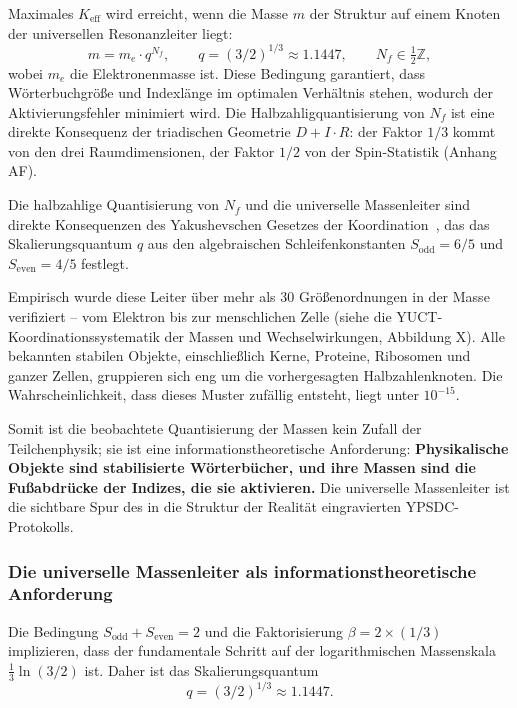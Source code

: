 \documentclass[12pt,a4paper]{article}
\theoremstyle{remark}
\begin{document}
	Maximales \(K_{\mathrm{eff}}\) wird erreicht, wenn die Masse \(m\) der Struktur auf einem Knoten der universellen Resonanzleiter liegt:
	\begin{equation}
		m = m_e \cdot q^{N_f}, \qquad
		q = (3/2)^{1/3} \approx 1.1447, \qquad N_f \in \tfrac{1}{2}\mathbb{Z},
		\label{eq:mass-ladder}
	\end{equation}
	wobei \(m_e\) die Elektronenmasse ist. Diese Bedingung garantiert, dass Wörterbuchgröße und Indexlänge im optimalen Verhältnis stehen, wodurch der Aktivierungsfehler minimiert wird. Die Halbzahligquantisierung von \(N_f\) ist eine direkte Konsequenz der triadischen Geometrie \(D+I\!\cdot\!R\): der Faktor \(1/3\) kommt von den drei Raumdimensionen, der Faktor \(1/2\) von der Spin-Statistik (Anhang AF).
	
	Die halbzahlige Quantisierung von \(N_f\) und die universelle Massenleiter sind direkte Konsequenzen des Yakushevschen Gesetzes der Koordination~\cite{YakushevLaw2026}, das das Skalierungsquantum \(q\) aus den algebraischen Schleifenkonstanten \(S_{\mathrm{odd}} = 6/5\) und \(S_{\mathrm{even}} = 4/5\) festlegt.
	
	Empirisch wurde diese Leiter über mehr als 30 Größenordnungen in der Masse verifiziert – vom Elektron bis zur menschlichen Zelle (siehe die YUCT-Koordinationssystematik der Massen und Wechselwirkungen, Abbildung X). Alle bekannten stabilen Objekte, einschließlich Kerne, Proteine, Ribosomen und ganzer Zellen, gruppieren sich eng um die vorhergesagten Halbzahlenknoten. Die Wahrscheinlichkeit, dass dieses Muster zufällig entsteht, liegt unter \(10^{-15}\).
	
	Somit ist die beobachtete Quantisierung der Massen kein Zufall der Teilchenphysik; sie ist eine informationstheoretische Anforderung: \textbf{Physikalische Objekte sind stabilisierte Wörterbücher, und ihre Massen sind die Fußabdrücke der Indizes, die sie aktivieren.} Die universelle Massenleiter ist die sichtbare Spur des in die Struktur der Realität eingravierten YPSDC-Protokolls.
	
	\subsubsection{Die universelle Massenleiter als informationstheoretische Anforderung}
	
	Die Bedingung \(S_{\mathrm{odd}} + S_{\mathrm{even}} = 2\) und die Faktorisierung \(\beta = 2 \times (1/3)\) implizieren, dass der fundamentale Schritt auf der logarithmischen Massenskala \(\frac{1}{3}\ln(3/2)\) ist. Daher ist das Skalierungsquantum
	\[
	q = (3/2)^{1/3} \approx 1.1447.
	\]
	
\end{document}
